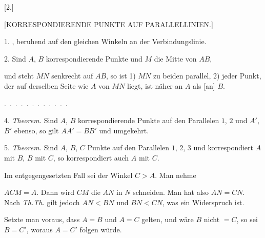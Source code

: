 \begin{center}[2.]\end{center}

\begin{center}[KORRESPONDIERENDE PUNKTE AUF PARALLELLINIEN.]\end{center}

1. \emph{} , beruhend auf den gleichen Winkeln an der Verbindungslinie.

2. Sind $A$, $B$ korrespondierende Punkte und $M$ die Mitte von $AB$,

\begin{center}

\end{center}
\noindent und steht $MN$ senkrecht auf $AB$, so ist 1) $MN$ zu beiden parallel, 2) jeder Punkt, der auf derselben Seite wie $A$ von $MN$ liegt, ist näher an $A$ als [an] $B$.

.\ .\ .\ .\ .\ .\ .\ .\ .\ .\ .\ . 

4. \emph{Theorem.} Sind $A$, $B$ korrespondierende Punkte auf den Parallelen $1$, $2$ und $A'$, $B'$ ebenso, so gilt $AA' = BB'$ und umgekehrt.

5. \emph{Theorem.} Sind $A$, $B$, $C$ Punkte auf den Parallelen $1$, $2$, $3$ und korrespondiert $A$ mit $B$, $B$ mit $C$, so korrespondiert auch $A$ mit $C$.

 Im entgegengesetzten Fall sei der Winkel $C > A$. Man nehme

\begin{center}

\end{center}
\noindent $ACM = A$. Dann wird $CM$ die $AN$ in $N$ schneiden. Man hat also $AN = CN$. Nach \emph{Th.Th.} gilt jedoch $AN < BN$ und $BN < CN$, was ein Widerspruch ist.

Setzte man voraus, dass $A = B$ und $A = C$ gelten, und wäre $B$ nicht $= C$, so sei $B = C'$, woraus $A = C'$ folgen würde.

